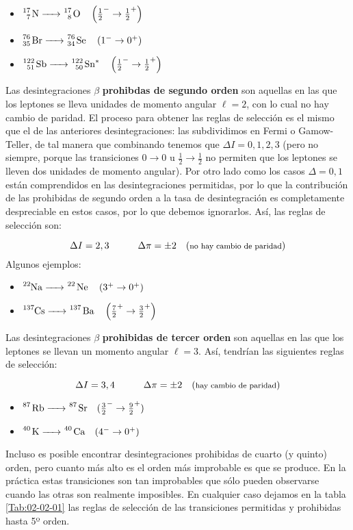 \begin{itemize}
	\item $\ce{^17_7 N -> ^17_8 O} \quad \parentesis{\frac{1}{2}^- \rightarrow \frac{1}{2}^+}$
	\item $\ce{^76_35 Br -> ^76_34 Se}  \quad \parentesis{1^- \rightarrow 0^+}$
	\item $\ce{^122_51 Sb -> ^122_50 Sn^*}  \quad \parentesis{\frac{1}{2}^- \rightarrow \frac{1}{2}^+}$
\end{itemize}
Las desintegraciones $\beta$ \textbf{prohibdas de segundo orden} son aquellas en las que los leptones se lleva unidades de momento angular $\ell=2$, con lo cual no hay cambio de paridad. El proceso para obtener las reglas de selección es el mismo que el de las anteriores desintegraciones: las subdividimos en Fermi o Gamow-Teller, de tal manera que combinando tenemos que $\Delta I = 0,1,2,3$ (pero no siempre, porque las transiciones $0\rightarrow 0$ u $\frac{1}{2} \rightarrow \frac{1}{2}$ no permiten que los leptones se lleven dos unidades de momento angular). Por otro lado como los casos $\Delta = 0,1$ están comprendidos en las desintegraciones permitidas, por lo que la contribución de las prohibidas de segundo orden a la tasa de desintegración es completamente despreciable en estos casos, por lo que debemos ignorarlos. Así, las reglas de selección son:

\begin{equation}
	\Delta I = 2,3 \quad \quad \quad \Delta \pi = \pm 2\quad (\text{{\footnotesize no hay cambio de paridad}})
\end{equation}
Algunos ejemplos:

\begin{itemize}
	\item $\ce{^22Na ->^22 Ne} \quad \parentesis{3^+ \rightarrow 0^+}$  
	\item $\ce{^137Cs ->^137 Ba} \quad \parentesis{\frac{7}{2}^+ \rightarrow \frac{3}{2}^+}$  
\end{itemize}

Las desintegraciones $\beta$ \textbf{prohibidas de tercer orden} son aquellas en las que los leptones se llevan un momento angular $\ell=3$. Así, tendrían las siguientes reglas de selección:

\begin{equation}
	\Delta I = 3,4 \quad \quad \quad \Delta \pi = \pm 2\quad (\text{{\footnotesize  hay cambio de paridad}})
\end{equation}

\begin{itemize}
	\item $\ce{^87 Rb -> ^87 Sr} \quad (\frac{3}{2}^- \rightarrow \frac{9}{2}^+)$
	\item $\ce{^40 K -> ^40 Ca} \quad (4^- \rightarrow 0^+)$
\end{itemize}
Incluso es posible encontrar desintegraciones prohibidas de cuarto (y quinto) orden, pero cuanto más alto es el orden más improbable es que se produce. En la práctica estas transiciones son tan improbables que sólo pueden observarse cuando las otras son realmente imposibles. En cualquier caso dejamos en la tabla \ref{Tab:02-02-01} las reglas de selección de las transiciones permitidas y prohibidas hasta 5º orden.


